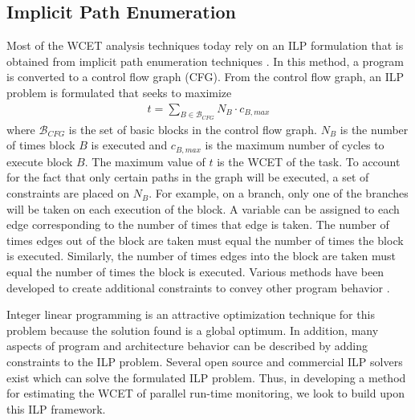 \subsection{Implicit Path Enumeration}
\label{sec:formulation:ipet}

Most of the WCET analysis techniques today rely on an ILP formulation that is 
obtained from implicit path enumeration techniques \cite{li-ipet-dac95}. 
In this method, a program is converted to a control flow
graph (CFG). From the control flow graph, an ILP problem is formulated that
seeks to maximize
\begin{align*}
  t = \sum_{B \in \mathcal{B}_{CFG}}{N_B \cdot c_{B,max}}
\end{align*} 
where $\mathcal{B}_{CFG}$ is the set of basic blocks in the control flow graph. $N_{B}$
is the number of times block $B$ is executed and $c_{B,max}$ is the maximum number of cycles
to execute block $B$. The maximum value of $t$ is the WCET of the task.  To
account for the fact that only certain paths in the graph will be executed, a
set of constraints are placed on $N_{B}$. For example, on a branch, only one of
the branches will be taken on each execution
of the block. A variable can be assigned to each edge corresponding to the
number of times that edge is taken.
The number of times edges out of the block are taken must equal the number of
times the block is executed.
 Similarly,
the number of times edges into the block are taken must equal the number of
times the block is executed. Various methods have been developed to
create additional constraints to convey other program behavior \cite{li-ipet-dac95, wcetsurvey-tecs08}.

Integer linear programming is an attractive optimization technique
for this problem because the solution found is a global optimum. In
addition, many aspects of program and architecture behavior can be described by
adding constraints to the ILP problem. 
Several open source and commercial ILP solvers exist which can solve the formulated ILP problem.
Thus, in developing a method for
estimating the WCET of parallel run-time monitoring, we look to build upon this
ILP framework.

